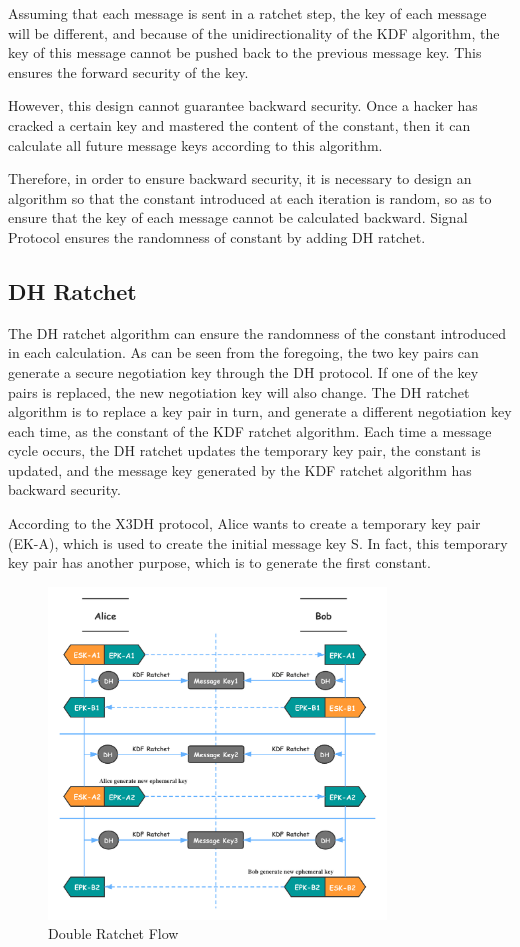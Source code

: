 \documentclass[11pt]{article}
\begin{document}
Assuming that each message is sent in a ratchet step, the key of each message will be different, and because of the unidirectionality of the KDF algorithm, the key of this message cannot be pushed back to the previous message key. 
This ensures the forward security of the key.

However, this design cannot guarantee backward security. Once a hacker has cracked a certain key and mastered the content of the constant, then it can calculate all future message keys according to this algorithm.

Therefore, in order to ensure backward security, it is necessary to design an algorithm so that the constant introduced at each iteration is random, so as to ensure that the key of each message cannot be calculated backward. 
Signal Protocol ensures the randomness of constant by adding DH ratchet.

\subsection{DH Ratchet}
\label{dualsection}
The DH ratchet algorithm can ensure the randomness of the constant introduced in each calculation. As can be seen from the foregoing, the two key pairs can generate a secure negotiation key through the DH protocol. If one of the key pairs is replaced, the new negotiation key will also change. The DH ratchet algorithm is to replace a key pair in turn, and generate a different negotiation key each time, as the constant of the KDF ratchet algorithm. Each time a message cycle occurs, the DH ratchet updates the temporary key pair, the constant is updated, and the message key generated by the KDF ratchet algorithm has backward security.

According to the X3DH protocol, Alice wants to create a temporary key pair (EK-A), which is used to create the initial message key S. In fact, this temporary key pair has another purpose, which is to generate the first constant.

\begin{figure}[H]
    \centering
    \includegraphics[width=0.8\textwidth]{Fig4}
    \caption{Double Ratchet Flow}
\end{figure}
\end{document}

